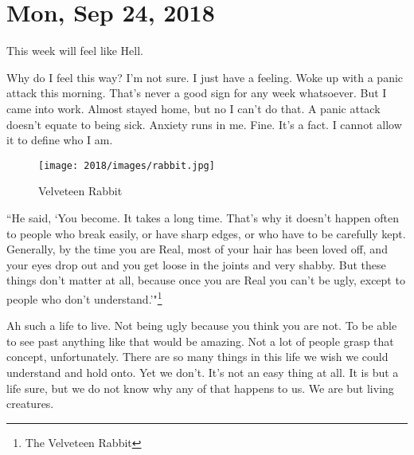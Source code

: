 \section{Mon, Sep 24, 2018}

This week will feel like Hell.

Why do I feel this way? I'm not sure. I just have a feeling. Woke up with a panic
attack this morning. That's never a good sign for any week whatsoever. But I came
into work. Almost stayed home, but no I can't do that. A panic attack doesn't equate
to being sick. Anxiety runs in me. Fine. It's a fact. I cannot allow it to define who
I am.

\begin{figure}[h!]
  \centering
  \texttt{[image: 2018/images/rabbit.jpg]}
  \caption{Velveteen Rabbit}
  \label{fig:rabbit}
\end{figure}

``He said, `You become. It takes a long time. That's why it doesn't happen often to
people who break easily, or have sharp edges, or who have to be carefully kept.
Generally, by the time you are Real, most of your hair has been loved off, and your
eyes drop out and you get loose in the joints and very shabby. But these things don't
matter at all, because once you are Real you can't be ugly, except to people who
don't understand.'"\footnote{The Velveteen Rabbit}

Ah such a life to live. Not being ugly because you think you are not. To be able to
see past anything like that would be amazing. Not a lot of people grasp that concept,
unfortunately. There are so many things in this life we wish we could understand and
hold onto. Yet we don't. It's not an easy thing at all. It is but a life sure, but we
do not know why any of that happens to us. We are but living creatures.
